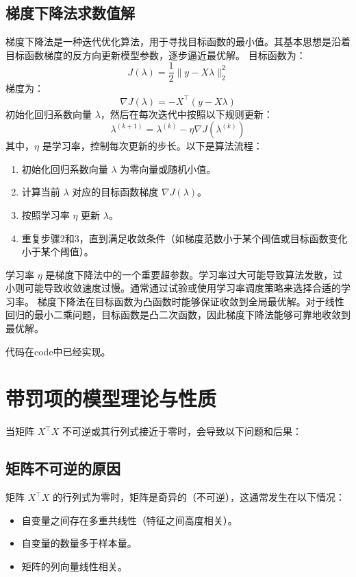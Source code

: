 \documentclass[lang=cn,11pt,a4paper]{elegantpaper}
\begin{document}
\subsection{梯度下降法求数值解}
梯度下降法是一种迭代优化算法，用于寻找目标函数的最小值。其基本思想是沿着目标函数梯度的反方向更新模型参数，逐步逼近最优解。
目标函数为：
\begin{equation}
J(\lambda) = \frac{1}{2} \| y - X \lambda \|_2^2
\end{equation}
梯度为：
\begin{equation}
\nabla J(\lambda) = -X^\top (y - X \lambda)
\end{equation}
初始化回归系数向量 \( \lambda \)，然后在每次迭代中按照以下规则更新：
\begin{equation}
\lambda^{(k+1)} = \lambda^{(k)} - \eta \nabla J(\lambda^{(k)})
\end{equation}
其中，\( \eta \) 是学习率，控制每次更新的步长。以下是算法流程：
\begin{enumerate}
    \item 初始化回归系数向量 \( \lambda \) 为零向量或随机小值。
    \item 计算当前 \( \lambda \) 对应的目标函数梯度 \( \nabla J(\lambda) \)。
    \item 按照学习率 \( \eta \) 更新 \( \lambda \)。
    \item 重复步骤2和3，直到满足收敛条件（如梯度范数小于某个阈值或目标函数变化小于某个阈值）。
\end{enumerate}
\par
学习率 \( \eta \) 是梯度下降法中的一个重要超参数。学习率过大可能导致算法发散，过小则可能导致收敛速度过慢。通常通过试验或使用学习率调度策略来选择合适的学习率。
梯度下降法在目标函数为凸函数时能够保证收敛到全局最优解。对于线性回归的最小二乘问题，目标函数是凸二次函数，因此梯度下降法能够可靠地收敛到最优解。
\par
代码在code中已经实现。
\section{带罚项的模型理论与性质}
当矩阵 \( X^\top X \) 不可逆或其行列式接近于零时，会导致以下问题和后果：
\subsection{矩阵不可逆的原因}
矩阵 \( X^\top X \) 的行列式为零时，矩阵是奇异的（不可逆），这通常发生在以下情况：
\begin{itemize}
    \item 自变量之间存在多重共线性（特征之间高度相关）。
    \item 自变量的数量多于样本量。
    \item 矩阵的列向量线性相关。
\end{itemize}
\end{document}
